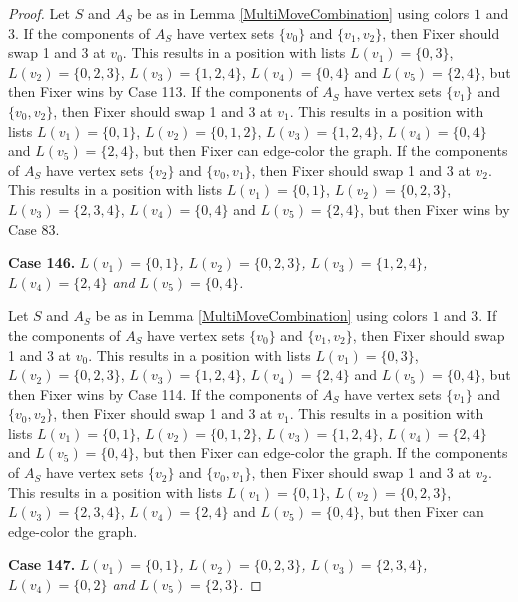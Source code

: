 \documentclass[12pt]{amsart}
\theoremstyle{plain}
\theoremstyle{definition}
\theoremstyle{remark}
\begin{document}
\begin{proof}
Let $S$ and $A_S$ be as in Lemma \ref{MultiMoveCombination} using colors $1$ and $3$. If the components of $A_S$ have vertex sets $\{v_0\}$ and $\{v_1, v_2\}$, then Fixer should swap 1 and 3 at $v_0$. This results in a position with lists $L(v_1) = \{0, 3\}$, $L(v_2) = \{0, 2, 3\}$, $L(v_3) = \{1, 2, 4\}$, $L(v_4) = \{0, 4\}$ and $L(v_5) = \{2, 4\}$, but then Fixer wins by Case 113.
If the components of $A_S$ have vertex sets $\{v_1\}$ and $\{v_0, v_2\}$, then Fixer should swap 1 and 3 at $v_1$. This results in a position with lists $L(v_1) = \{0, 1\}$, $L(v_2) = \{0, 1, 2\}$, $L(v_3) = \{1, 2, 4\}$, $L(v_4) = \{0, 4\}$ and $L(v_5) = \{2, 4\}$, but then Fixer can edge-color the graph.
If the components of $A_S$ have vertex sets $\{v_2\}$ and $\{v_0, v_1\}$, then Fixer should swap 1 and 3 at $v_2$. This results in a position with lists $L(v_1) = \{0, 1\}$, $L(v_2) = \{0, 2, 3\}$, $L(v_3) = \{2, 3, 4\}$, $L(v_4) = \{0, 4\}$ and $L(v_5) = \{2, 4\}$, but then Fixer wins by Case 83.

\noindent\textbf{Case 146.  }\textit{$L(v_1) = \{0, 1\}$, $L(v_2) = \{0, 2, 3\}$, $L(v_3) = \{1, 2, 4\}$, $L(v_4) = \{2, 4\}$ and $L(v_5) = \{0, 4\}$.}

Let $S$ and $A_S$ be as in Lemma \ref{MultiMoveCombination} using colors $1$ and $3$. If the components of $A_S$ have vertex sets $\{v_0\}$ and $\{v_1, v_2\}$, then Fixer should swap 1 and 3 at $v_0$. This results in a position with lists $L(v_1) = \{0, 3\}$, $L(v_2) = \{0, 2, 3\}$, $L(v_3) = \{1, 2, 4\}$, $L(v_4) = \{2, 4\}$ and $L(v_5) = \{0, 4\}$, but then Fixer wins by Case 114.
If the components of $A_S$ have vertex sets $\{v_1\}$ and $\{v_0, v_2\}$, then Fixer should swap 1 and 3 at $v_1$. This results in a position with lists $L(v_1) = \{0, 1\}$, $L(v_2) = \{0, 1, 2\}$, $L(v_3) = \{1, 2, 4\}$, $L(v_4) = \{2, 4\}$ and $L(v_5) = \{0, 4\}$, but then Fixer can edge-color the graph.
If the components of $A_S$ have vertex sets $\{v_2\}$ and $\{v_0, v_1\}$, then Fixer should swap 1 and 3 at $v_2$. This results in a position with lists $L(v_1) = \{0, 1\}$, $L(v_2) = \{0, 2, 3\}$, $L(v_3) = \{2, 3, 4\}$, $L(v_4) = \{2, 4\}$ and $L(v_5) = \{0, 4\}$, but then Fixer can edge-color the graph.

\noindent\textbf{Case 147.  }\textit{$L(v_1) = \{0, 1\}$, $L(v_2) = \{0, 2, 3\}$, $L(v_3) = \{2, 3, 4\}$, $L(v_4) = \{0, 2\}$ and $L(v_5) = \{2, 3\}$.}


\end{proof}
\end{document}
